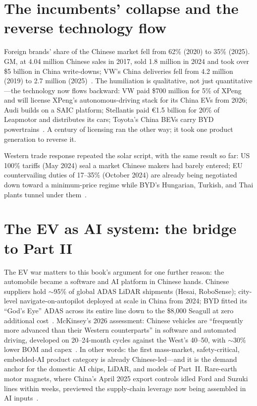 \section{The incumbents' collapse and the reverse technology flow}

Foreign brands' share of the Chinese market fell from 62\% (2020) to 35\% (2025). GM, at 4.04 million Chinese sales in 2017, sold 1.8 million in 2024 and took over \$5 billion in China write-downs; VW's China deliveries fell from 4.2 million (2019) to 2.7 million (2025)~\cite{gm-collapse,vw-decline}. The humiliation is qualitative, not just quantitative---the technology now flows backward: VW paid \$700 million for 5\% of XPeng and will license XPeng's autonomous-driving stack for its China EVs from 2026; Audi builds on a SAIC platform; Stellantis paid €1.5 billion for 20\% of Leapmotor and distributes its cars; Toyota's China BEVs carry BYD powertrains~\cite{reverse-flow}. A century of licensing ran the other way; it took one product generation to reverse it.

Western trade response repeated the solar script, with the same result so far: US 100\% tariffs (May 2024) seal a market Chinese makers had barely entered; EU countervailing duties of 17--35\% (October 2024) are already being negotiated down toward a minimum-price regime while BYD's Hungarian, Turkish, and Thai plants tunnel under them~\cite{us-tariff,eu-cvd}.

\section{The EV as AI system: the bridge to Part II}

The EV war matters to this book's argument for one further reason: the automobile became a software and AI platform in Chinese hands. Chinese suppliers hold $\sim$95\% of global ADAS LiDAR shipments (Hesai, RoboSense); city-level navigate-on-autopilot deployed at scale in China from 2024; BYD fitted its ``God's Eye'' ADAS across its entire line down to the \$8,000 Seagull at zero additional cost~\cite{lidar,gods-eye}. McKinsey's 2026 assessment: Chinese vehicles are ``frequently more advanced than their Western counterparts'' in software and automated driving, developed on 20--24-month cycles against the West's 40--50, with $\sim$30\% lower BOM and capex~\cite{mckinsey-2026}. In other words: the first mass-market, safety-critical, embedded-AI product category is already Chinese-led---and it is the demand anchor for the domestic AI chips, LiDAR, and models of Part~II. Rare-earth motor magnets, where China's April 2025 export controls idled Ford and Suzuki lines within weeks, previewed the supply-chain leverage now being assembled in AI inputs~\cite{csis-rare-earth}.

